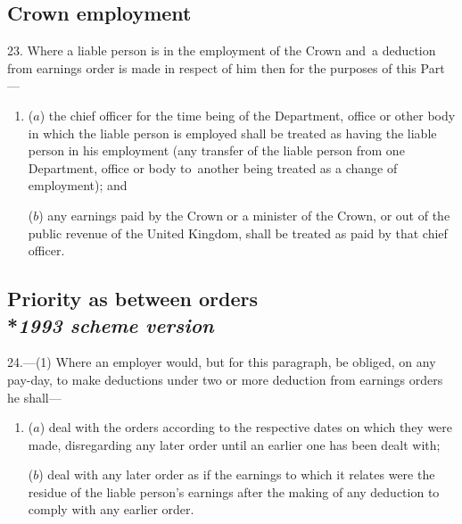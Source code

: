 \documentclass[12pt,a4paper]{article}
\begin{document}

\subsection[23. Crown employment]{Crown employment}

23.  Where a liable person is in the employment of the Crown and~a deduction from earnings order is made in respect of him then for the purposes of this Part—
\begin{enumerate}\item[]
($a$) the chief officer for the time being of the Department, office or other body in which the liable person is employed shall be treated as having the liable person in his employment (any transfer of the liable person from one Department, office or body to~another being treated as a change of employment); and

($b$) any earnings paid by the Crown or a minister of the Crown, or out of the public revenue of the United Kingdom, shall be treated as paid by that chief officer.
\end{enumerate}

\subsection[24. Priority as between orders --- \emph{1993 scheme version}]{Priority as between orders\\*\emph{1993 scheme version}}

24.—(1) Where an employer would, but for this paragraph, be obliged, on any pay-day, to make deductions under two or more deduction from earnings orders he shall—
\begin{enumerate}\item[]
($a$) deal with the orders according to the respective dates on which they were made, disregarding any later order until an earlier one has been dealt with;

($b$) deal with any later order as if the earnings to which it relates were the residue of the liable person’s earnings after the making of any deduction to comply with any earlier order.
\end{enumerate}
\end{document}

